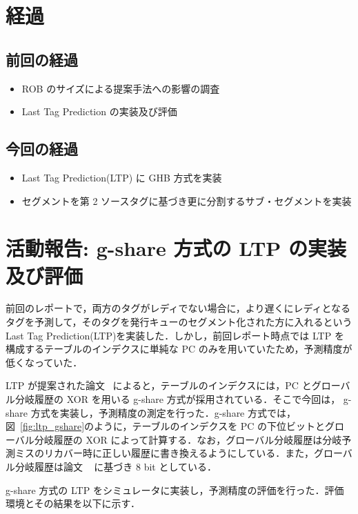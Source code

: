 \documentclass[twocolumn]{jsarticle}
\begin{document}
  \section{経過}

  \subsection{前回の経過}
  \begin{itemize}
    \item ROB のサイズによる提案手法への影響の調査
    \item Last Tag Prediction の実装及び評価
  \end{itemize}
  \subsection{今回の経過}
  \begin{itemize}
    \item Last Tag Prediction(LTP) に GHB 方式を実装
    \item セグメントを第 2 ソースタグに基づき更に分割するサブ・セグメントを実装
  \end{itemize}    

  \section{活動報告: g-share 方式の LTP の実装及び評価}
  前回のレポートで，両方のタグがレディでない場合に，より遅くにレディとなるタグを予測して，そのタグを発行キューのセグメント化された方に入れるという Last Tag Prediction(LTP)を実装した．しかし，前回レポート時点では LTP を構成するテーブルのインデクスに単純な PC のみを用いていたため，予測精度が低くなっていた． 

  LTP が提案された論文~\cite{ernst2002} によると，テーブルのインデクスには，PC とグローバル分岐履歴の XOR を用いる g-share 方式が採用されている．そこで今回は，  g-share 方式を実装し，予測精度の測定を行った．g-share 方式では，図~\ref{fig:ltp_gshare}のように，テーブルのインデクスを PC の下位ビットとグローバル分岐履歴の XOR によって計算する．なお，グローバル分岐履歴は分岐予測ミスのリカバー時に正しい履歴に書き換えるようにしている．また，グローバル分岐履歴は論文 ~\cite{ernst2002} に基づき 8 bit としている．

  g-share 方式の LTP をシミュレータに実装し，予測精度の評価を行った．評価環境とその結果を以下に示す．
\end{document}
